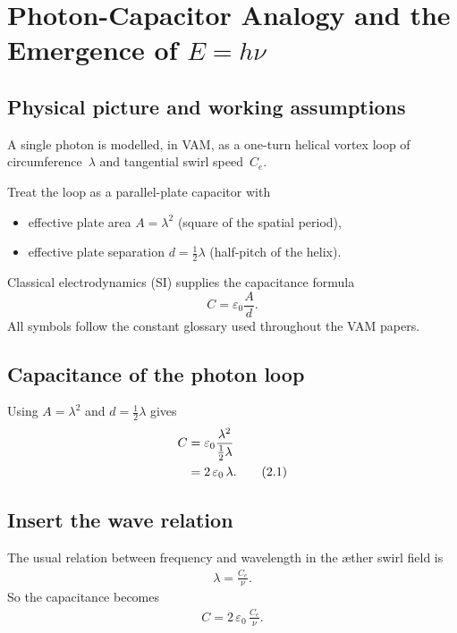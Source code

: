\documentclass[a4paper,12pt]{article}
\begin{document}

\section{Photon-Capacitor Analogy and the Emergence of $E = h\nu$}

\subsection{Physical picture and working assumptions}

A single photon is modelled, in VAM, as a one-turn helical vortex loop of circumference~$\lambda$ and tangential swirl speed~$C_e$.

Treat the loop as a parallel-plate capacitor with
\begin{itemize}
    \item effective plate area $A = \lambda^2$ (square of the spatial period),
    \item effective plate separation $d = \tfrac{1}{2}\lambda$ (half-pitch of the helix).
\end{itemize}

Classical electrodynamics (SI) supplies the capacitance formula
\[
    C = \varepsilon_0 \frac{A}{d}.
\]
All symbols follow the constant glossary used throughout the VAM papers.

\subsection{Capacitance of the photon loop}

Using $A = \lambda^2$ and $d = \tfrac{1}{2}\lambda$ gives
\begin{align}
    C &= \varepsilon_0 \frac{\lambda^2}{\tfrac{1}{2}\lambda} \notag \\
      &= 2\,\varepsilon_0\,\lambda.
    \tag{2.1}
\end{align}

\subsection{Insert the wave relation}

The usual relation between frequency and wavelength in the æther swirl field is
\begin{align}
    \lambda = \frac{C_e}{\nu}.
    \tag{3.1}
\end{align}
So the capacitance becomes
\begin{align}
    C = 2\,\varepsilon_0\,\frac{C_e}{\nu}.
    \tag{3.2}
\end{align}
\end{document}
